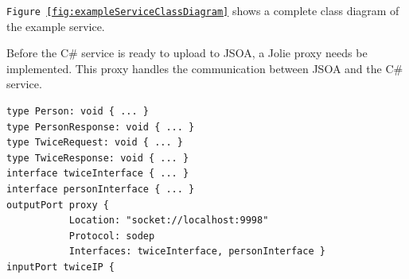 \documentclass[12pt,a4paper]{article}
\begin{document}
\texttt{Figure \ref{fig:exampleServiceClassDiagram}} shows a complete class diagram of the example service.

Before the C\# service is ready to upload to JSOA, a Jolie proxy needs be implemented. This proxy handles the communication between JSOA and the C\# service.

\begin{lstlisting}[caption={Jolie-C\# proxy},label={lst:JolieCSharpProxy}]
type Person: void { ... }                                                                                                                                                                                                            
type PersonResponse: void { ... }
type TwiceRequest: void { ... }                                                                                                                                                                                                            
type TwiceResponse: void { ... }                                                                                                                                                                                                            
interface twiceInterface { ... }                                                                                                                                                                                                            
interface personInterface { ... }                                                                                                                                                                                                            
outputPort proxy {                                                                                                                                                                                           
           Location: "socket://localhost:9998"                                                                                                                                                               
           Protocol: sodep                                                                                                                                                                                   
           Interfaces: twiceInterface, personInterface }                                                                                                                                                                                                            
inputPort twiceIP {                                                                                                                                                                                          

\end{lstlisting}
\end{document}
